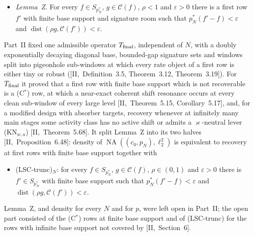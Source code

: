 \documentclass[10pt]{amsart}
\theoremstyle{definition}
\theoremstyle{remark}
\newcommand{\NA}{\operatorname{NA}}
\newcommand{\dist}{\operatorname{dist}}
\newcommand{\Cset}{\mathcal C}
\begin{document}
\begin{itemize}
\item[] \emph{Lemma~Z.}  For every $f\in S_{p_N^*}$, $g\in\Cset(f)$,
$\rho<1$ and $\varepsilon>0$ there is a first row $f'$ with finite base
support and signature room such that $p_N^*(f'-f)<\varepsilon$ and
$\dist(\rho g,\Cset(f'))<\varepsilon$.
\end{itemize}

Part~II fixed one admissible operator $T_{\rm final}$, independent of $N$,
with a doubly exponentially decaying diagonal base, bounded-gap signature
sets and windows split into pigeonhole sub-windows at which every rate
object of a first row is either tiny or robust ([II,~Definition~3.5,
Theorem~3.12, Theorem~3.19]).  For $T_{\rm final}$ it proved that a first
row with finite base support which is not recoverable is a (C$^*$) row, at
which a near-exact coherent shift resonance occurs at every clean
sub-window of every large level [II,~Theorem~5.15, Corollary~5.17], and,
for a modified design with absorber targets, recovery whenever at
infinitely many main stages some activity class has no active shift or
admits a $\varkappa$-neutral lever (KN$_{w,a}$) [II,~Theorem~5.68].  It
split Lemma~Z into its two halves [II,~Proposition~6.48]: density of
$\NA((c_0,p_N),\ell_2^2)$ is equivalent to recovery at first rows with
finite base support together with
\begin{itemize}
\item[] \textup{(LSC-trunc)$_N$}: for every $f\in S_{p_N^*}$, $g\in\Cset(f)$,
$\rho\in(0,1)$ and $\varepsilon>0$ there is $f'\in S_{p_N^*}$ with finite
base support such that $p_N^*(f'-f)<\varepsilon$ and
$\dist(\rho g,\Cset(f'))<\varepsilon$.
\end{itemize}
Lemma~Z, and density for every $N$ and for $p$, were left open in Part~II;
the open part consisted of the (C$^*$) rows at finite base support and of
(LSC-trunc) for the rows with infinite base support not covered by
[II,~Section~6].
\end{document}
